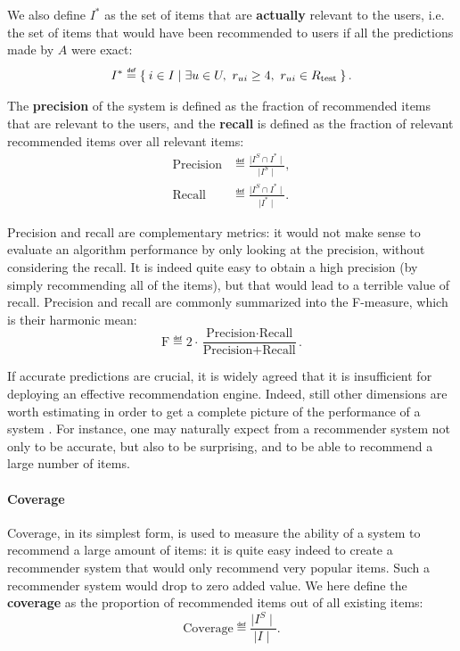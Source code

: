 We also define $I^*$ as the set of items that are \textbf{actually} relevant to
the users, i.e.  the set of items that would have been recommended to users if
all the predictions made by $A$ were exact:
$$I^* \eqdef \Set{i \in I | \exists u \in U, ~\rui \geq 4,~ \rui \in \Rtest}.$$

\noindent
The \textbf{precision} of the
system is
defined as the fraction of recommended items that are relevant to the users,
and the \textbf{recall} is defined as the fraction of relevant recommended
items over all relevant items:
\begin{align*}
  \text{Precision} &\eqdef \frac{\mid I^S \cap I^*\mid}{\mid I^S \mid},\\
  \text{Recall} &\eqdef \frac{\mid I^S \cap I^*\mid}{\mid I^* \mid}.
\end{align*}

Precision and recall are complementary metrics: it would not make sense to
evaluate an algorithm performance by only looking at the precision, without
considering the recall. It is indeed quite easy to obtain a high precision (by
simply recommending all of the items), but that would lead to a terrible
value of recall. Precision and recall are commonly summarized into the
F-measure, which is their harmonic mean:
  $$
  \text{F} \eqdef 2 \cdot \frac{\text{Precision} \cdot
  \text{Recall}}{\text{Precision} + \text{Recall}}.
  $$

If accurate predictions are crucial, it is widely agreed that it is
insufficient for deploying an effective recommendation engine. Indeed, still
other dimensions are worth estimating in order to get a complete picture of the
performance of a system
\cite{NeeRieKonACM2006,HerKonJohTerRieACM2004,KamBriRecSys2014}.  For instance,
one may naturally expect from a recommender system not only to be accurate, but
also to be surprising, and to be able to recommend a large number of items.

\paragraph{Coverage\\}
Coverage, in its simplest form, is used to measure the ability of a system to
recommend a large amount of items: it is quite easy indeed to create a
recommender system that would only recommend very popular items. Such a
recommender system would drop to zero added value. We here define the
\textbf{coverage} as the proportion of recommended items out of all existing
items:
$$\text{Coverage} \eqdef \frac{\mid I^S\mid}{\mid I\mid}.$$

